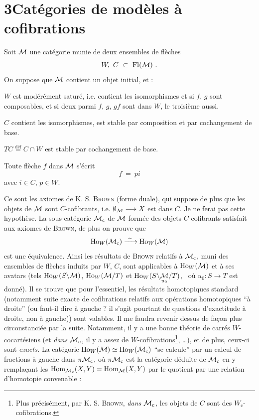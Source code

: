 \section*{3\quad Catégories de modèles à cofibrations}

Soit $\mathcal{M}$ une catégorie munie de deux ensembles de flèches
\[ W,\ C\ \subset\ \mathrm{Fl}(\M)\ . \]
On suppose que $\mathcal{M}$ contient un objet initial, et :
\begin{description}[leftmargin=3em, labelwidth=2.5em]
\item[Cof$_0$] $W$ est modérément saturé, i.e. contient les isomorphismes et si $f$, $g$ sont composables, et si deux parmi $f$, $g$, $gf$ sont dans $W$, le troisième aussi.
\item[Cof$_1$] $C$ contient les isomorphismes, est stable par composition et par cochangement de base.
\item[Cof$_2$] $TC \overset{\text{déf}}{=} C \cap W$ est stable par cochangement de base.
\item[Cof$_3$] Toute flèche $f$ dans $\mathcal{M}$ s'écrit
\[ f \ = \ pi \]
avec $i \in C$, $p \in W$.
\end{description}
Ce sont les axiomes de K. S. \textsc{Brown} (forme duale), qui suppose de plus que les objets de $\mathcal{M}$ sont $C$-cofibrants, i.e. $\emptyset_{\mathcal{M}} \longrightarrow X$ est dans $C$. Je ne ferai pas cette hypothèse. La sous-catégorie $\mathcal{M}_{\mathrm{c}}$ de $\mathcal{M}$ formée des  objets $C$-cofibrants satisfait aux axiomes de \textsc{Brown}, de plus on prouve que
\[ \mathrm{Ho}_W(\mathcal{M}_{\mathrm{c}}) \xrightarrow{\ \sim\ } \mathrm{Ho}_W(\mathcal{M}) \]
est une équivalence. Ainsi les résultats de \textsc{Brown} relatifs à $\mathcal{M}_{\mathrm{c}}$, muni des ensembles de flèches induits par $W$, $C$, sont applicables à $\mathrm{Ho}_W(\mathcal{M})$ et à ses avatars (tels $\mathrm{Ho}_W(S\backslash\mathcal{M})$, $\mathrm{Ho}_W(\mathcal{M}/T)$ et $\mathrm{Ho}_W(S\backslash\underset{u_0}{\mathcal{M}}/T)$, \ où $u_0 : S \longrightarrow T$ est donné). Il se trouve que pour l'essentiel, les résultats homotopiques standard (notamment suite exacte de cofibrations relatifs aux opérations homotopiques “à droite” (ou faut-il dire à gauche ? il s'agit pourtant de questions d'exactitude à droite, non à gauche)) sont valables. Il me faudra revenir dessus de façon plus circonstanciée par la suite. Notamment, il y a une bonne théorie de carrés $W$-cocartésiens (et \textit{dans} $\mathcal{M}_{\mathrm{c}}$\textit{,} il y a assez de $W$-cofibrations\footnote[14]{Plus précisément, par K. S. \textsc{Brown}, \textit{dans} $\mathcal{M}_{\mathrm{c}}$\textit{,} les objets de $C$ sont des $W_{\mathrm{c}}$-cofibrations.}, \ldots),
et de plus, ceux-ci sont \textit{exacts.} La catégorie $\mathrm{Ho}_W(\mathcal{M}) \simeq \mathrm{Ho}_W(\mathcal{M}_{\mathrm{c}})$ “se calcule” par un calcul de fractions à gauche dans $\pi\mathcal{M}_{\mathrm{c}}$, où $\pi\mathcal{M}_{\mathrm{c}}$ est la catégorie déduite de $\mathcal{M}_{\mathrm{c}}$ en y remplaçant les $\mathrm{Hom}_{\mathcal{M}_{\mathrm{c}}}(X,Y) = \mathrm{Hom}_{\mathcal{M}}(X,Y)$ par le quotient par une relation d'homotopie convenable :
